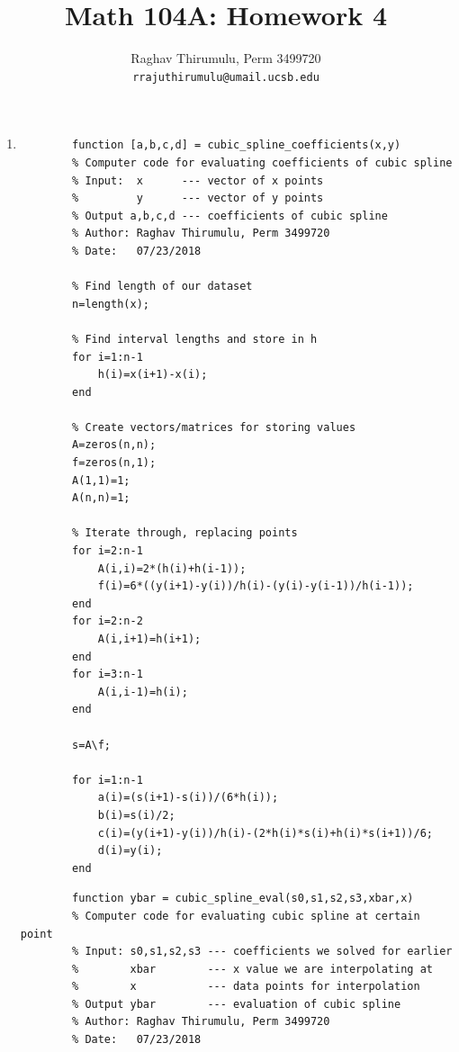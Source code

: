 \documentclass{article}
\begin{document}
\title{Math 104A: Homework 4}
\author{Raghav Thirumulu, Perm 3499720 \\ \texttt{rrajuthirumulu@umail.ucsb.edu}}
\maketitle

\begin{enumerate}
    \item %
        \begin{lstlisting}
        function [a,b,c,d] = cubic_spline_coefficients(x,y)
        % Computer code for evaluating coefficients of cubic spline
        % Input:  x      --- vector of x points
        %         y      --- vector of y points
        % Output a,b,c,d --- coefficients of cubic spline
        % Author: Raghav Thirumulu, Perm 3499720
        % Date:   07/23/2018

        % Find length of our dataset
        n=length(x);

        % Find interval lengths and store in h
        for i=1:n-1
            h(i)=x(i+1)-x(i);
        end

        % Create vectors/matrices for storing values
        A=zeros(n,n);
        f=zeros(n,1);
        A(1,1)=1;
        A(n,n)=1;

        % Iterate through, replacing points
        for i=2:n-1
            A(i,i)=2*(h(i)+h(i-1));
            f(i)=6*((y(i+1)-y(i))/h(i)-(y(i)-y(i-1))/h(i-1));
        end
        for i=2:n-2
            A(i,i+1)=h(i+1);
        end
        for i=3:n-1
            A(i,i-1)=h(i);
        end

        s=A\f;

        for i=1:n-1
            a(i)=(s(i+1)-s(i))/(6*h(i));
            b(i)=s(i)/2;
            c(i)=(y(i+1)-y(i))/h(i)-(2*h(i)*s(i)+h(i)*s(i+1))/6;
            d(i)=y(i);
        end
        \end{lstlisting}
        
        \begin{lstlisting}
        function ybar = cubic_spline_eval(s0,s1,s2,s3,xbar,x)
        % Computer code for evaluating cubic spline at certain point
        % Input: s0,s1,s2,s3 --- coefficients we solved for earlier
        %        xbar        --- x value we are interpolating at
        %        x           --- data points for interpolation
        % Output ybar        --- evaluation of cubic spline
        % Author: Raghav Thirumulu, Perm 3499720
        % Date:   07/23/2018


\end{lstlisting}
\end{enumerate}
\end{document}
